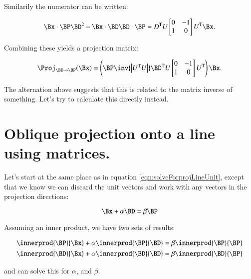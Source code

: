 \documentclass{article}      %
\newcommand{\T}[0]{\text{T}}
\begin{document}
Similarily the numerator can be written:

\[
\Bx \cdot \BP \BD^2 - \Bx \cdot \BD \BD \cdot \BP =
D^\T U
\begin{bmatrix}
0 & -1 \\
1 & 0 \\
\end{bmatrix}
U^\T \Bx.
\]

Combining these yields a projection matrix:

\begin{equation}\label{eqn:matrixprojfromwedge}
\Proj_{\BD \rightarrow \BP}(\Bx) =
\left(
\BP
\inv{
\begin{vmatrix}
U^\T U
\end{vmatrix}
}
\BD^\T U
\begin{bmatrix}
0 & -1 \\
1 & 0 \\
\end{bmatrix}
U^\T\right) \Bx.
\end{equation}

The alternation above suggests that this is related to the matrix inverse of something.  Let's try to calculate this directly instead.

\section{ Oblique projection onto a line using matrices. }

Let's start at the same place as in equation \ref{eqn:solveForprojLineUnit}, except that we know we can discard the unit vectors and work with any vectors in the projection directions:

\begin{equation}\label{eqn:solveForprojLineNonUnit}
\Bx + \alpha \BD = \beta \BP
\end{equation}

Assuming an inner product, we have two sets of results:

\begin{align*}
\innerprod{\BP}{\Bx} + \alpha \innerprod{\BP}{\BD} &= \beta \innerprod{\BP}{\BP} \\
\innerprod{\BD}{\Bx} + \alpha \innerprod{\BD}{\BD} &= \beta \innerprod{\BD}{\BP} \\
\end{align*}

and can solve this for $\alpha$, and $\beta$.
\end{document}
